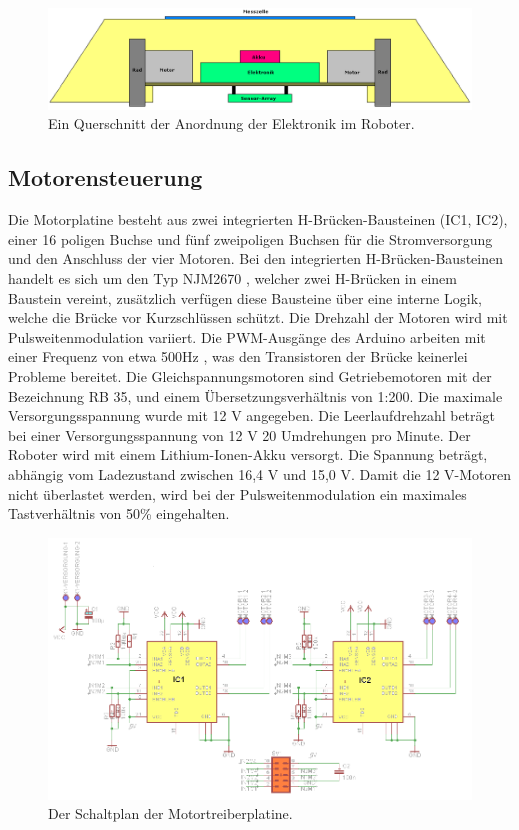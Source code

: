 \documentclass[a4paper,bibtotoc,oneside]{scrbook}
\begin{document}
\begin{figure}[htbp]
\centering
\includegraphics[width=150mm]{img/vorne.png}
\caption{Ein Querschnitt der Anordnung der Elektronik im Roboter.}\label{vorne}
\end{figure}

\FloatBarrier
 
\subsection{Motorensteuerung}\thispagestyle{empty}

Die Motorplatine besteht aus zwei integrierten H-Brücken-Bausteinen (IC1, IC2), einer 16 poligen Buchse und fünf zweipoligen Buchsen für die Stromversorgung und den Anschluss der vier Motoren. Bei den integrierten H-Brücken-Bausteinen handelt es sich um den Typ NJM2670 \cite{njm}, welcher zwei H-Brücken in einem Baustein vereint, zusätzlich verfügen diese Bausteine über eine interne Logik, welche die Brücke vor Kurzschlüssen schützt.
Die Drehzahl der Motoren wird mit Pulsweitenmodulation variiert. Die PWM-Ausgänge des Arduino arbeiten mit einer Frequenz von etwa 500Hz \cite{pwm}, was den Transistoren der Brücke keinerlei Probleme bereitet.
Die Gleichspannungsmotoren sind Getriebemotoren mit der Bezeichnung RB 35, und einem Übersetzungsverhältnis von 1:200. Die maximale Versorgungsspannung wurde mit 12 V angegeben. Die Leerlaufdrehzahl beträgt bei einer Versorgungsspannung von 12 V 20 Umdrehungen pro Minute.
Der Roboter wird mit einem Lithium-Ionen-Akku versorgt. Die Spannung beträgt, abhängig vom Ladezustand zwischen 16,4 V und 15,0 V. Damit die 12 V-Motoren nicht überlastet werden, wird bei der Pulsweitenmodulation ein maximales Tastverhältnis von 50\% eingehalten.

\begin{figure}[htbp]
\centering
\includegraphics[width=150mm]{img/HBrucke.png}
\caption{Der Schaltplan der Motortreiberplatine.}\label{hbridge1}
\end{figure}
\end{document}
